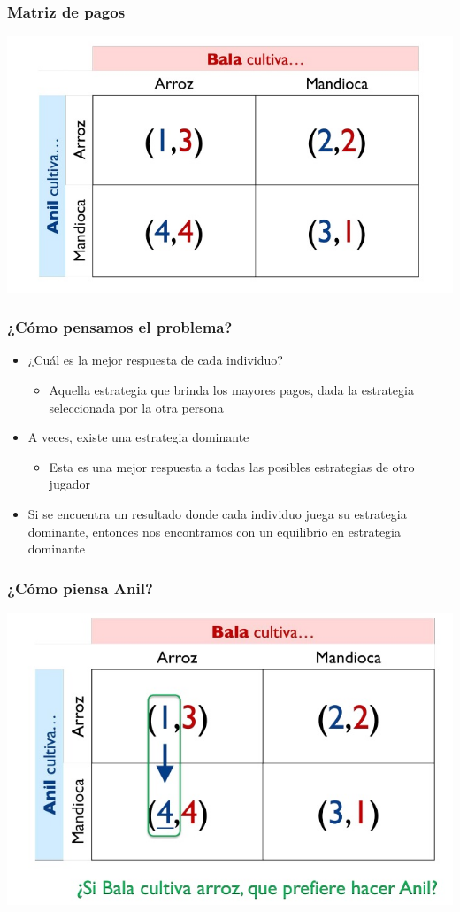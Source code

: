 \documentclass{beamer}
\begin{document}
\begin{frame}
\frametitle{Matriz de pagos}
\centering
\includegraphics[scale=0.6]{Figures/Tema_03_12_bala.jpg}
\end{frame}

\begin{frame}
\frametitle{¿Cómo pensamos el problema?}
\begin{itemize}
    \item ¿Cuál es la mejor respuesta de cada individuo?
        \begin{itemize}
        \item Aquella estrategia que brinda los mayores pagos, dada la estrategia seleccionada por la otra persona
        \end{itemize}
    \item A veces, existe una estrategia dominante
        \begin{itemize}
        \item Esta es una mejor respuesta a todas las posibles estrategias de otro jugador
        \end{itemize}
    \item Si se encuentra un resultado donde cada individuo juega su estrategia dominante, entonces nos encontramos con un equilibrio en estrategia dominante
\end{itemize}
\end{frame}

\begin{frame}
\frametitle{ ¿Cómo piensa Anil?}
\centering
\includegraphics[scale=0.6]{Figures/Tema_03_13_bala.jpg}
\end{frame}
\end{document}

